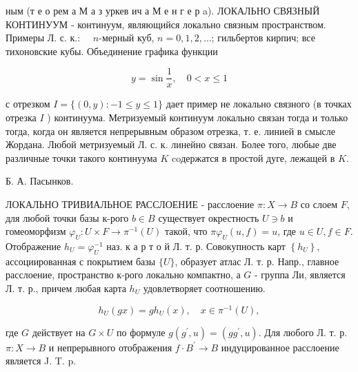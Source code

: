 \documentclass[10pt]{article}
\begin{document}
ным (т е о рем а М а з уркев ич а М е н г е р a). ЛОКАЛЬНО СВЯЗНЫЙ КОНТИНУУМ - континуум, являющийся локально связным пространством. Примеры Л. с. к.: $\quad n$-мерный куб, $n=0,1,2, \ldots$; гильбертов кирпич; все тихоновские кубы. Объединение графика функции



\[

y=\sin \frac{1}{x}, \quad 0<x \leqslant 1

\]



с отрезком $I=\{(0, y):-1 \leqslant y \leqslant 1\}$ дает пример не локально связного (в точках отрезка $I$ ) континуума. Метризуемый континуум локально связан тогда и только тогда, когда он является непрерывным образом отрезка, т. е. линией в смысле Жордана. Любой метризуемый Л. с. к. линейно связан. Более того, любые две различные точки такого континуума $K$ coдержатся в простой дуге, лежащей в $K$.



Б. А. Пасынков.



ЛОКАЛЬНО ТРИВИАЛЬНОЕ РАССЛОЕНИЕ - расслоение $\pi: X \rightarrow B$ со слоем $F$, для любой точки базы к-рого $b \in B$ существует окрестность $U \ni b$ и гомеоморфизм $\varphi_{U}: U \times F \rightarrow \pi^{-1}(U)$ такой, что $\pi \varphi_{U}(u, f)=u$, где $u \in U, f \in F$. Отображение $h_{U}=\varphi_{U}^{-1}$ наз. к а р т о й Л. т. р. Совокупность карт $\left\{h_{U}\right\}$, ассоциированная с покрытием базы $\{U\}$, образует атлас Л. т. р. Напр., главное расслоение, пространство к-рого локально компактно, а $G$ - группа Ли, является Л. т. р., причем любая карта $h_{U}$ удовлетворяет соотношению.



\[

h_{U}(g x)=g h_{U}(x), \quad x \in \pi^{-1}(U),

\]



где $G$ действует на $G \times U$ по формуле $g\left(g^{\prime}, u\right)=\left(g g^{\prime}, u\right)$. Для любого Л. т. р. $\pi: X \rightarrow B$ и непрерывного отображения $f \cdot B^{\prime} \rightarrow B$ индуцированное расслоение является J. T. p.
\end{document}
